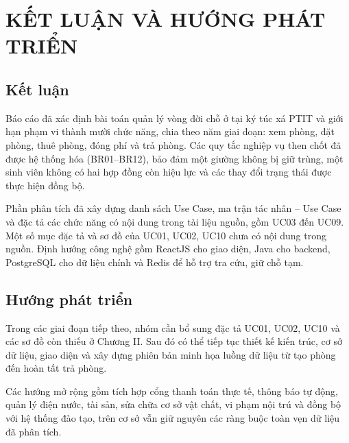 \clearpage
\chapter*{KẾT LUẬN VÀ HƯỚNG PHÁT TRIỂN}
{}

\section*{Kết luận}
{}

Báo cáo đã xác định bài toán quản lý vòng đời chỗ ở tại ký túc xá PTIT và giới hạn phạm vi thành mười chức năng, chia theo năm giai đoạn: xem phòng, đặt phòng, thuê phòng, đóng phí và trả phòng. Các quy tắc nghiệp vụ then chốt đã được hệ thống hóa (BR01--BR12), bảo đảm một giường không bị giữ trùng, một sinh viên không có hai hợp đồng còn hiệu lực và các thay đổi trạng thái được thực hiện đồng bộ.

Phần phân tích đã xây dựng danh sách Use Case, ma trận tác nhân -- Use Case và đặc tả các chức năng có nội dung trong tài liệu nguồn, gồm UC03 đến UC09. Một số mục đặc tả và sơ đồ của UC01, UC02, UC10 chưa có nội dung trong nguồn. Định hướng công nghệ gồm ReactJS cho giao diện, Java cho backend, PostgreSQL cho dữ liệu chính và Redis để hỗ trợ tra cứu, giữ chỗ tạm.

\section*{Hướng phát triển}
{}

Trong các giai đoạn tiếp theo, nhóm cần bổ sung đặc tả UC01, UC02, UC10 và các sơ đồ còn thiếu ở Chương II. Sau đó có thể tiếp tục thiết kế kiến trúc, cơ sở dữ liệu, giao diện và xây dựng phiên bản minh họa luồng dữ liệu từ tạo phòng đến hoàn tất trả phòng.

Các hướng mở rộng gồm tích hợp cổng thanh toán thực tế, thông báo tự động, quản lý điện nước, tài sản, sửa chữa cơ sở vật chất, vi phạm nội trú và đồng bộ với hệ thống đào tạo, trên cơ sở vẫn giữ nguyên các ràng buộc toàn vẹn dữ liệu đã phân tích.
